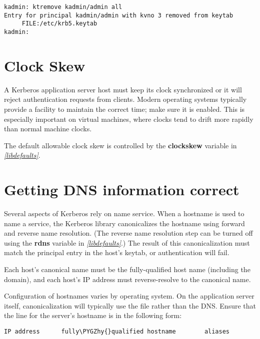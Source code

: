 \documentclass[letterpaper,10pt,english]{sphinxmanual}
\def\PYGZhy{\char`\-}
\begin{document}
\begin{Verbatim}[commandchars=\\\{\}]
kadmin: ktremove kadmin/admin all
Entry for principal kadmin/admin with kvno 3 removed from keytab
     FILE:/etc/krb5.keytab
kadmin:
\end{Verbatim}


\section{Clock Skew}
\label{admin/appl_servers:clock-skew}
A Kerberos application server host must keep its clock synchronized or
it will reject authentication requests from clients.  Modern operating
systems typically provide a facility to maintain the correct time;
make sure it is enabled.  This is especially important on virtual
machines, where clocks tend to drift more rapidly than normal machine
clocks.

The default allowable clock skew is controlled by the \textbf{clockskew}
variable in {\hyperref[admin/conf_files/krb5_conf:libdefaults]{\emph{{[}libdefaults{]}}}}.


\section{Getting DNS information correct}
\label{admin/appl_servers:getting-dns-information-correct}
Several aspects of Kerberos rely on name service.  When a hostname is
used to name a service, the Kerberos library canonicalizes the
hostname using forward and reverse name resolution.  (The reverse name
resolution step can be turned off using the \textbf{rdns} variable in
{\hyperref[admin/conf_files/krb5_conf:libdefaults]{\emph{{[}libdefaults{]}}}}.)  The result of this canonicalization must match
the principal entry in the host's keytab, or authentication will fail.

Each host's canonical name must be the fully-qualified host name
(including the domain), and each host's IP address must
reverse-resolve to the canonical name.

Configuration of hostnames varies by operating system.  On the
application server itself, canonicalization will typically use the
 file rather than the DNS.  Ensure that the line for the
server's hostname is in the following form:

\begin{Verbatim}[commandchars=\\\{\}]
IP address      fully\PYGZhy{}qualified hostname        aliases
\end{Verbatim}
\end{document}
